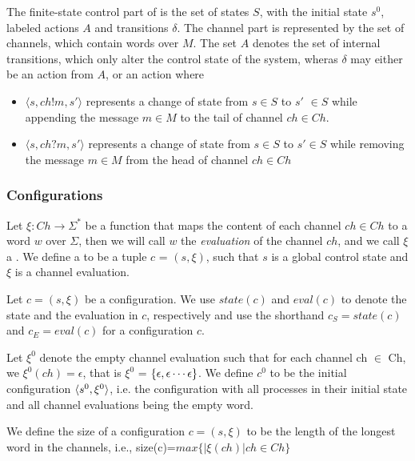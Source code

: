 The finite-state control part of  is the set of states $S$, with the initial state $s^0$, labeled actions $A$ and transitions $\delta$. The channel part is represented by the set  of channels, which contain words over $M$. The set $A$ denotes the set of internal transitions, which only alter the control state of the system, wheras $\delta$ may either be an action from $A$, or an action where

\begin{itemize}
\item[]
$\langle s, ch!m, s'\rangle$ represents a change of state from $s \in S$ to $s'$ $\in S$ while appending the message $m\in M$ to the tail of channel $ch\in Ch$.
\item[]
$\langle s, ch?m, s'\rangle$ represents a change of state from $s\in S$ to $s'\in S$ while removing the message $m\in M$ from the head of channel $ch \in Ch$
\end{itemize}



\subsubsection{Configurations}
Let $\xi : Ch \rightarrow \Sigma^*$ be a function that maps the content of each channel $ch \in Ch$ to a word $w$ over $\Sigma$, then we will call $w$ the \emph{evaluation} of the channel $ch$, and we call $\xi$ a . We define a  to be a tuple $c$ = $(s, \xi)$, such that $s$ is a global control state and $\xi$ is a channel evaluation.

Let $c=(s,\xi)$ be a configuration. We use $state(c)$ and $eval(c)$  to denote the state and the evaluation in $c$, respectively and use the shorthand $c_{S} = state(c)$ and $c_{E} = eval(c)$ for a configuration $c$.

Let $\xi^0$ denote the empty channel evaluation such that for each channel ch $\in$ Ch, we $\xi^0(ch)=\epsilon$, that is $\xi^0$ = $\left\{\epsilon,\epsilon\cdots\epsilon\right\}$. We define $c^0$ to be the initial configuration $\langle s^0, \xi^0\rangle$, i.e. the configuration with all processes in their initial state and all channel evaluations being the empty word.

We define the size of a configuration $c = (s,\xi)$ to be the length of the longest word in the channels, i.e., size(c)=$max\{|\xi(ch)| ch \in Ch\}$


